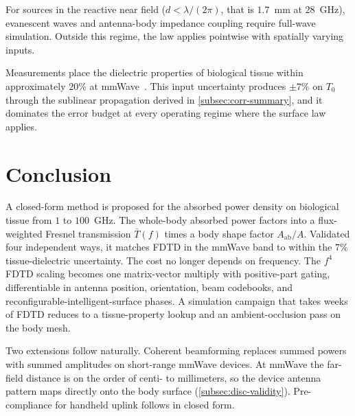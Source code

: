 \documentclass[journal,twocolumn,10pt]{IEEEtran}
\newcommand{\Aab}{A_{\mathrm{ab}}}
\newcommand{\Tbar}{\bar{T}}
\begin{document}
For sources in the reactive near field ($d < \lambda/(2\pi)$, that is
$1.7$~mm at $28$~GHz), evanescent waves and antenna-body impedance
coupling require full-wave simulation. Outside this regime, the law
applies pointwise with spatially varying inputs.

Measurements place the dielectric properties of biological tissue
within approximately $20\%$ at mmWave~\cite{AlekseevZiskin2007}. This
input uncertainty produces $\pm 7\%$ on $T_0$ through the sublinear
propagation derived in \cref{subsec:corr-summary}, and it dominates
the error budget at every operating regime where the surface law
applies.

\section{Conclusion}\label{sec:conc}

A closed-form method is proposed for the absorbed power density on
biological tissue from $1$ to $100$~GHz. The whole-body absorbed
power factors into a flux-weighted Fresnel transmission $\Tbar(f)$
times a body shape factor $\Aab/A$. Validated four independent ways, it matches FDTD in the mmWave band
to within the $7\%$ tissue-dielectric uncertainty. The cost no longer
depends on frequency. The $f^4$ FDTD scaling becomes one matrix-vector multiply
with positive-part gating, differentiable in antenna position,
orientation, beam codebooks, and reconfigurable-intelligent-surface
phases. A simulation campaign that takes
weeks of FDTD reduces to a tissue-property lookup and an
ambient-occlusion pass on the body mesh.

Two extensions follow naturally. Coherent beamforming replaces
summed powers with summed amplitudes on short-range mmWave devices.
At mmWave the far-field distance is on the order of centi- to
millimeters, so the device antenna pattern maps directly onto the body
surface
(\cref{subsec:disc-validity}). Pre-compliance for handheld uplink
follows in closed form.
\end{document}
